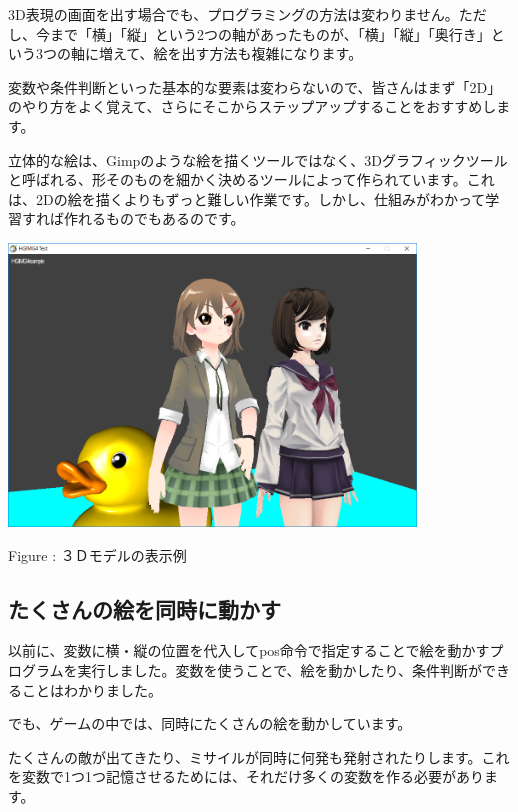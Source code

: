 \documentclass[a4paper,12pt]{jarticle}
\newcounter{Figure}
\renewcommand\theFigure{\arabic{Figure}}
\begin{document}
\bigskip
\bigskip
\bigskip

3D表現の画面を出す場合でも、プログラミングの方法は変わりません。ただし、今まで「横」「縦」という2つの軸があったものが、「横」「縦」「奥行き」という3つの軸に増えて、絵を出す方法も複雑になります。

変数や条件判断といった基本的な要素は変わらないので、皆さんはまず「2D」のやり方をよく覚えて、さらにそこからステップアップすることをおすすめします。

立体的な絵は、Gimpのような絵を描くツールではなく、3Dグラフィックツールと呼ばれる、形そのものを細かく決めるツールによって作られています。これは、2Dの絵を描くよりもずっと難しい作業です。しかし、仕組みがわかって学習すれば作れるものでもあるのです。

\bigskip
\bigskip

\begin{minipage}{9.781cm}
\centering
{\upshape
\includegraphics[keepaspectratio,width=10.834cm,height=7.514cm]{text04-img/text04-img035.png}
\flushleft

Figure \stepcounter{Figure}{\theFigure}: ３Ｄモデルの表示例}
\end{minipage}

\bigskip
\bigskip
\bigskip

\clearpage
\subsection{たくさんの絵を同時に動かす}
\bigskip
\bigskip

以前に、変数に横・縦の位置を代入してpos命令で指定することで絵を動かすプログラムを実行しました。変数を使うことで、絵を動かしたり、条件判断ができることはわかりました。

でも、ゲームの中では、同時にたくさんの絵を動かしています。

たくさんの敵が出てきたり、ミサイルが同時に何発も発射されたりします。これを変数で1つ1つ記憶させるためには、それだけ多くの変数を作る必要があります。
\end{document}
